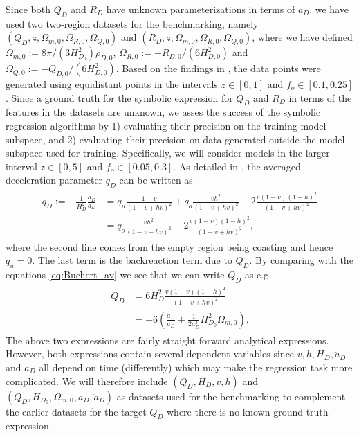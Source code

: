 \documentclass[a4paper,11pt]{article}
\begin{document}
	\newline\newline
	Since both $Q_D$ and $R_D$ have unknown parameterizations in terms of $a_D$, we have used two two-region datasets for the benchmarking, namely $(Q_D, z, \Omega_{m,0}, \Omega_{R,0}, \Omega_{Q,0})$ and $(R_D, z, \Omega_{m,0}, \Omega_{R,0}, \Omega_{Q,0})$, where we have defined $\Omega_{m,0}:=8\pi/(3H_{D_0}^2)\rho_{D,0}$, $\Omega_{R,0}:=-R_{D,0}/(6H_{D,0}^2)$ and $\Omega_{Q,0}:=-Q_{D,0}/(6H_{D,0}^2)$. Based on the findings in \cite{zdrift1,zdrift2}, the data points were generated using equidistant points in the intervals $z\in[0,1]$ and $f_o\in[0.1,0.25]$.
	\newline\newline
	Since a ground truth for the symbolic expression for $Q_D$ and $R_D$ in terms of the features in the datasets are unknown, we asses the success of the symbolic regression algorithms by 1) evaluating their precision on the training model subspace, and 2) evaluating their precision on data generated outside the model subspace used for training. Specifically, we will consider models in the larger interval $z\in[0,5]$ and $f_o\in[0.05, 0.3]$.
	\newline\newline
	As detailed in \cite{2region1,2region2}, the averaged deceleration parameter $q_D$ can be written as
	\begin{align}
	\begin{split}
	    q_D := -\frac{1}{H_D^2}\frac{\ddot a_D}{a_D}& = q_u\frac{1-v}{(1-v+hv)^2} + q_o\frac{vh^2}{(1-v+hv)^2} - 2\frac{v(1-v)(1-h)^2}{(1-v+hv)^2}\\
	    & = q_o\frac{vh^2}{(1-v+hv)^2} - 2\frac{v(1-v)(1-h)^2}{(1-v+hv)^2},
	\end{split}
	\end{align}
	where the second line comes from the empty region being coasting and hence $q_u = 0$. The last term is the backreaction term due to $Q_D$. By comparing with the equations \ref{eq:Buchert_av} we see that we can write $Q_D$ as e.g. 
	\begin{align}
		\begin{split}
		Q_D & = 6H_D^2\frac{v(1-v)(1-h)^2}{(1-v+hv)^2}\\
		&= -6\left( \frac{\ddot a_D}{a_D} + \frac{1}{2a_D^3}H_{D_0}^2\Omega_{m,0}\right). 
		\end{split}
	\end{align}
The above two expressions are fairly straight forward analytical expressions. However, both expressions contain several dependent variables since $v, h, H_D, \ddot a_D$ and $a_D$ all depend on time (differently) which may make the regression task more complicated. We will therefore include $\left(Q_D, H_D, v, h \right) $ and $\left( Q_D, H_{D_0}, \Omega_{m,0}, a_D, \ddot a_D \right) $ as datasets used for the benchmarking to complement the earlier datasets for the target $Q_D$ where there is no known ground truth expression.
\end{document}
